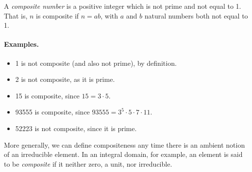 \documentclass[12pt]{article}
\begin{document}
A \emph{composite number} is a positive integer which is not prime and not equal to 1.  That is, $n$ is composite if $n = ab$, with $a$ and $b$ natural numbers both not equal to 1.

\paragraph{Examples.}

\begin{itemize}

\item 1 is not composite (and also not prime), by definition.

\item 2 is not composite, as it is prime.

\item 15 is composite, since $15 = 3\cdot 5$.

\item 93555 is composite, since $93555 = 3^5\cdot 5 \cdot 7 \cdot 11$.

\item 52223 is not composite, since it is prime.

\end{itemize}

More generally, we can define compositeness any time there is an ambient notion of an irreducible element. In an integral domain, for example, an element is said to be \emph{composite} if it neither zero, a unit, nor irreducible.
\end{document}
